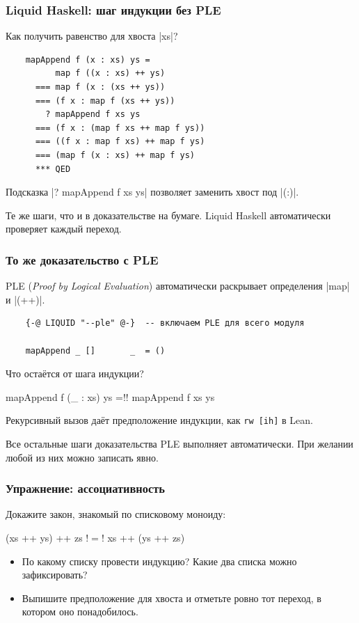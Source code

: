 \documentclass[11pt]{beamer}
\begin{document}
\begin{frame}[fragile]
  \frametitle{Liquid Haskell: шаг индукции без PLE}
  Как получить равенство для хвоста \haskinline|xs|?
  \pause
  \begin{verbatim}
    mapAppend f (x : xs) ys =
          map f ((x : xs) ++ ys)
      === map f (x : (xs ++ ys))
      === (f x : map f (xs ++ ys))
        ? mapAppend f xs ys
      === (f x : (map f xs ++ map f ys))
      === ((f x : map f xs) ++ map f ys)
      === (map f (x : xs) ++ map f ys)
      *** QED
  \end{verbatim}
  Подсказка \haskinline|? mapAppend f xs ys| позволяет заменить хвост под \haskinline|(:)|.
  \pause
  \par Те же шаги, что и в доказательстве на бумаге. Liquid Haskell автоматически проверяет каждый переход.
\end{frame}

\begin{frame}[fragile]
  \frametitle{То же доказательство с PLE}
  PLE (\emph{Proof by Logical Evaluation}) автоматически раскрывает определения \haskinline|map| и \haskinline|(++)|.
  \begin{verbatim}
    {-@ LIQUID "--ple" @-}  -- включаем PLE для всего модуля

    mapAppend _ []       _  = ()
  \end{verbatim}
  Что остаётся от шага индукции?
  \begin{haskellsmall}
    mapAppend f (_ : xs) ys =!\pause! mapAppend f xs ys
  \end{haskellsmall}
  Рекурсивный вызов даёт предположение индукции, как \texttt{rw [ih]} в Lean.
  \pause\par Все остальные шаги доказательства PLE выполняет автоматически. При желании любой из них можно записать явно.
\end{frame}

\begin{frame}[fragile]
  \frametitle{Упражнение: ассоциативность}
  Докажите закон, знакомый по списковому моноиду:
  \begin{haskell}
    (xs ++ ys) ++ zs !$=$! xs ++ (ys ++ zs)
  \end{haskell}
  \begin{itemize}
    \item По какому списку провести индукцию? Какие два списка можно зафиксировать?
    \item Выпишите предположение для хвоста и отметьте ровно тот переход, в котором оно понадобилось.
  \end{itemize}
\end{frame}
\end{document}
